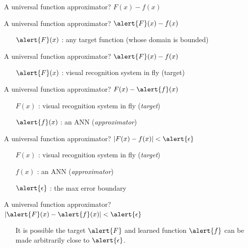 \documentclass[10pt]{beamer}
\begin{document}
\begin{frame}[fragile]{A universal function approximator?}
$F(x) - f(x)$
\end{frame}

\begin{frame}[fragile]{A universal function approximator?}
$\alert{F}(x) - f(x)$
\begin{itemize}
    \item[$\alert{F}(x)$] : any target function (whose domain is bounded)
\end{itemize}
\end{frame}

\begin{frame}[fragile]{A universal function approximator?}
$\alert{F}(x) - f(x)$
\begin{itemize}
    \item[$\alert{F}(x)$] : visual recognition system in fly (target)
\end{itemize}
\end{frame}

\begin{frame}[fragile]{A universal function approximator?}
$F(x) - \alert{f}(x)$ 
\begin{itemize}
\item[$F(x)$] : visual recognition system in fly (\textit{target})\\
\item[$\alert{f}(x)$] : an ANN (\textit{approximator})
\end{itemize}
\end{frame}

\begin{frame}[fragile]{A universal function approximator?}
$|F(x) - f(x)| < \alert{\epsilon}$ 
\begin{itemize}
\item[$F(x)$] : visual recognition system in fly (\textit{target})\\
\item[$f(x)$] : an ANN (\textit{approximator})
\item[$\alert{\epsilon}$] : the max error boundary
\end{itemize}
\end{frame}

\begin{frame}[fragile]{A universal function approximator?}
$|\alert{F}(x) - \alert{f}(x)| < \alert{\epsilon}$ 
\begin{itemize}
\item[] It is possible the target $\alert{F}$ and learned function $\alert{f}$ can be made arbitrarily close to $\alert{\epsilon}$.
\end{itemize}
\end{frame}
\end{document}

